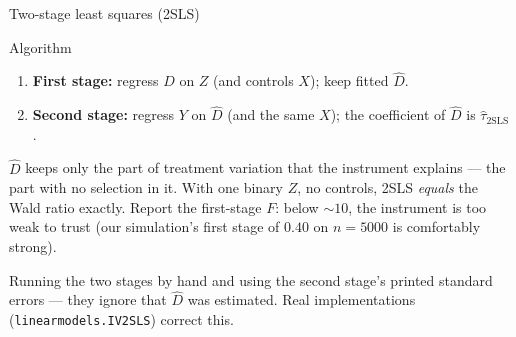 \documentclass[aspectratio=169,11pt]{beamer}
\begin{document}
\begin{frame}{Two-stage least squares (2SLS)}
  \footnotesize
  \begin{block}{Algorithm}
    \begin{enumerate}
      \item \textbf{First stage:} regress $D$ on $Z$ (and controls $X$); keep
            fitted $\hat D$.
      \item \textbf{Second stage:} regress $Y$ on $\hat D$ (and the same $X$); the
            coefficient of $\hat D$ is $\hat\tau_{\text{2SLS}}$.
    \end{enumerate}
  \end{block}
  \begin{readme}
    $\hat D$ keeps only the part of treatment variation that the instrument
    explains --- the part with no selection in it. With one binary $Z$, no controls,
    2SLS \emph{equals} the Wald ratio exactly. Report the first-stage $F$: below
    $\sim 10$, the instrument is too weak to trust (our simulation's first stage of
    $0.40$ on $n = 5000$ is comfortably strong).
  \end{readme}
  \begin{mistake}
    Running the two stages by hand and using the second stage's printed standard
    errors --- they ignore that $\hat D$ was estimated. Real implementations
    (\texttt{linearmodels.IV2SLS}) correct this.
  \end{mistake}
\end{frame}
\end{document}
